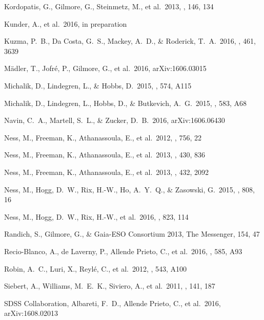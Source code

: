 \documentclass[preprint,trackchanges]{aastex}
\begin{document}
\begin{thebibliography}{dummy}
 Kordopatis, G., Gilmore, G., Steinmetz, M., et al.\ 2013, \aj, 146, 134 

 Kunder, A., et al.\ 2016, in preparation

 Kuzma, P.~B., Da Costa, G.~S., Mackey, A.~D., \& Roderick, T.~A.\ 2016, \mnras, 461, 3639 

 M{\"a}dler, T., Jofr{\'e}, P., Gilmore, G., et al.\ 2016, arXiv:1606.03015 

 Michalik, D., Lindegren, L., \& Hobbs, D.\ 2015, \aap, 574, A115 

 Michalik, D., Lindegren, L., Hobbs, D., \& Butkevich, A.~G.\ 2015, \aap, 583, A68 

 Navin, C.~A., Martell, S.~L., \& Zucker, D.~B.\ 2016, arXiv:1606.06430 

 Ness, M., Freeman, K., Athanassoula, E., et al.\ 2012, \apj, 756, 22 

 Ness, M., Freeman, K., Athanassoula, E., et al.\ 2013, \mnras, 430, 836 

 Ness, M., Freeman, K., Athanassoula, E., et al.\ 2013, \mnras, 432, 2092 

 Ness, M., Hogg, D.~W., Rix, H.-W., Ho, A.~Y.~Q., \& Zasowski, G.\ 2015, \apj, 808, 16 

 Ness, M., Hogg, D.~W., Rix, H.-W., et al.\ 2016, \apj, 823, 114 

 Randich, S., Gilmore, G., \& Gaia-ESO Consortium 2013, The Messenger, 154, 47 

 Recio-Blanco, A., de Laverny, P., Allende Prieto, C., et al.\ 2016, \aap, 585, A93 

 Robin, A.~C., Luri, X., Reyl{\'e}, C., et al.\ 2012, \aap, 543, A100 

 Siebert, A., Williams, M.~E.~K., Siviero, A., et al.\ 2011, \aj, 141, 187 

 SDSS Collaboration, Albareti, F.~D., Allende Prieto, C., et al.\ 2016, arXiv:1608.02013 


\end{thebibliography}
\end{document}

